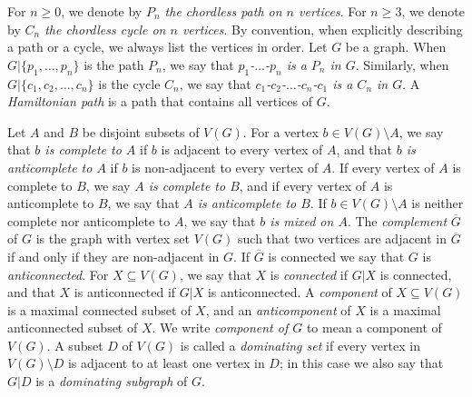 \documentclass[11pt]{article}
\begin{document}
For $n\geq 0$, we denote by \emph{$P_n$ the chordless path on $n$ vertices}. 
For $n\geq 3$, we denote by \emph{$C_n$ the chordless cycle on $n$ vertices}.
By convention, when explicitly describing a path or a cycle, we always list the vertices in order. 
Let $G$ be a graph. 
When $G|\{p_1,\ldots,p_n\}$ is the path $P_n$, we say that \emph{$p_1$-$\ldots$-$p_n$ is a $P_n$ in $G$}. 
Similarly, when $G|\{c_1,c_2,\ldots,c_n\}$ is the cycle $C_n$, we say that \emph{$c_1$-$c_2$-$\ldots$-$c_n$-$c_1$ is a $C_n$ in $G$}. 
A \emph{Hamiltonian path} is a path that contains all vertices of $G$.

Let $A$ and $B$ be disjoint subsets of $V(G)$. 
For a vertex $b\in V(G)\setminus A$, we say that \emph{$b$ is complete to $A$} if $b$ is adjacent to every vertex of $A$, and that \emph{$b$ is anticomplete to $A$} if $b$ is non-adjacent to every vertex of $A$. 
If every vertex of $A$ is complete to $B$, we say \emph{$A$ is complete to $B$}, and if every vertex of $A$ is anticomplete to $B$, we say that \emph{$A$ is anticomplete to $B$}. 
If $b\in V(G)\setminus A$ is neither complete nor anticomplete to $A$, we say that \emph{$b$ is mixed on $A$}. 
The \emph{complement} $\overline{G}$ of $G$ is the graph with vertex set $V(G)$ such that two vertices are adjacent in $\overline{G}$ if and only if they are non-adjacent in $G$. 
If $\overline{G}$ is connected we say that $G$ is \emph{anticonnected}. 
For $X \subseteq V(G)$, we say that $X$ is {\em connected} if $G|X$ is connected, and that $X$ is anticonnected if $G|X$ is anticonnected. 
A \emph{component} of $X \subseteq V(G)$ is a maximal connected subset of $X$, and an \emph{anticomponent} of $X$ is a maximal anticonnected subset of $X$. 
We write {\em component of $G$} to mean a component of $V(G)$.
A subset $D$ of $V(G)$ is called a \emph{dominating set} if every vertex in $V(G)\setminus D$ is adjacent to at least one vertex in $D$; in this case we also say that $G|D$ is a \emph{dominating subgraph} of $G$. 
\end{document}

